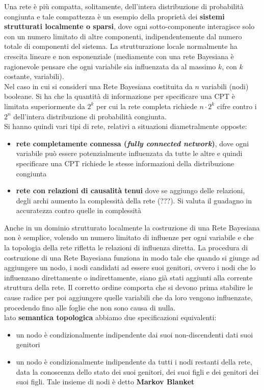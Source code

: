 \documentclass[a4paper,12pt, oneside]{book}
\begin{document}
Una rete è più compatta, solitamente, dell'intera distribuzione di probabilità
congiunta e tale compattezza è un esempio della proprietà dei \textbf{sistemi
  strutturati localmente o sparsi}, dove ogni sotto-componente interagisce solo
con un numero limitato di 
altre componenti, indipendentemente dal numero totale di componenti del
sistema. La strutturazione locale normalmente ha crescita lineare e non
esponenziale (mediamente con una rete Bayesiana è ragionevole pensare che ogni
variabile sia influenzata da al massimo $k$, con $k$ costante, variabili).\\  
Nel caso in cui si consideri una Rete Bayesiana costituita da $n$ variabili
(nodi) booleane. Si ha che la quantità di informazione per specificare una CPT è
limitata superiormente da $2^k$ per cui la rete completa richiede $n\cdot 2^k$
cifre contro i $2^n$ dell'intera distribuzione di probabilità congiunta.\\
Si hanno quindi vari tipi di rete, relativi a situazioni diametralmente opposte:
\begin{itemize}
  \item \textbf{rete completamente connessa (\textit{fully connected network})},
  dove ogni variabile può essere potenzialmente influenzata da tutte le altre e
  quindi specificare una CPT richiede le stesse informazioni della distribuzione
  congiunta
  \item \textbf{rete con relazioni di causalità tenui} dove se aggiungo delle
  relazioni, degli archi aumento la complessità della rete (???). Si valuta il
  guadagno in accuratezza contro quelle in complessità
\end{itemize}
Anche in un dominio strutturato localmente la costruzione di una Rete Bayesiana
non è semplice, volendo un numero limitato di influenze per ogni variabile e che
la topologia della rete rifletta le relazioni di influenza diretta. La procedura
di costruzione di una Rete Bayesiana funziona in modo tale che quando si giunge
ad aggiungere un nodo, i nodi candidati ad essere suoi genitori, ovvero i nodi
che lo influenzano direttamente o indirettamente, siano già stati aggiunti alla
corrente struttura della rete. Il corretto ordine comporta che si devono prima
stabilire le cause radice per poi aggiungere quelle variabili che da loro
vengono influenzate, procedendo fino alle foglie che non sono causa di nulla. \\
lato \textbf{semantica topologica} abbiamo due specificazioni equivalenti:
\begin{itemize}
  \item un nodo è condizionalmente indipendente dai suoi non-discendenti dati
  suoi genitori
  \item un nodo è condizionalmente indipendente da tutti i nodi restanti della
  rete, data la conoscenza dello stato dei suoi genitori, dei suoi figli e dei
  genitori dei suoi figli. Tale insieme di nodi è detto \textbf{Markov Blanket}
\end{itemize}
\end{document}
